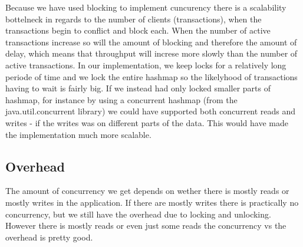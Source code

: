 \documentclass{article}
\theoremstyle{plain}
\theoremstyle{nonumberplain}
\begin{document}
Because we have used blocking to implement cuncurency there is a scalability bottelneck in regards to the number of clients (transactions), when the transactions begin to conflict and block each. 
When the number of active transactions increase so will the amount of blocking and therefore the amount of delay, which means that throughput will increse more slowly than the number of active transactions. 
In our implementation, we keep locks for a relatively long periode of time and we lock the entire hashmap so the likelyhood of transactions having to wait is fairly big.
If we instead had only locked smaller parts of hashmap, for instance by using a concurrent hashmap (from the java.util.concurrent library) we could have supported both concurrent reads and writes - if the writes was on different parts of the data. This would have made the implementation much more scalable.

\subsection{Overhead}
The amount of concurrency we get depends on wether there is mostly reads or mostly writes in the application. If there are mostly writes there is practically no concurrency, but we still have the overhead due to locking and unlocking. However there is mostly reads or even just some reads the concurrency vs the overhead is pretty good.
\end{document}
